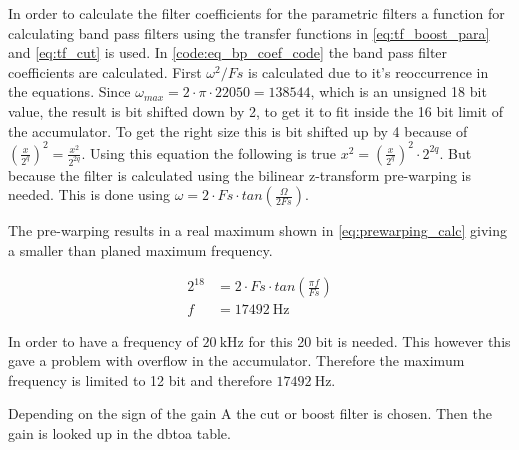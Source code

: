 In order to calculate the filter coefficients for the parametric filters a function for calculating band pass filters using the transfer functions in \autoref{eq:tf_boost_para} and \autoref{eq:tf_cut} is used. 
In \autoref{code:eq_bp_coef_code} the band pass filter coefficients are calculated. First $\omega^2/Fs$ is calculated due to it's reoccurrence in the equations. Since $\omega_{max} = 2\cdot \pi \cdot 22050 = 138544$, which is an unsigned 18 bit value, the result is bit shifted down by 2, to get it to fit inside the 16 bit limit of the accumulator. To get the right size this is bit shifted up by 4 because of $(\frac{x}{2^{q}})^2=\frac{x^2}{2^{2 q}}$. Using this equation the following is true $x^2=(\frac{x}{2^q})^2 \cdot 2^{2q}$. But because the filter is calculated using the bilinear z-transform pre-warping is needed. This is done using $\omega = 2\cdot Fs \cdot tan(\frac{\Omega}{2Fs})$.

The pre-warping results in a real maximum shown in \autoref{eq:prewarping_calc} giving a smaller than planed maximum frequency.

\begin{equation}\label{eq:prewarping_calc}
\begin{split}
	2^{18}&= 2\cdot Fs \cdot tan(\frac{\pi f}{Fs})\\
	f &= \SI{17492}{\hertz}
\end{split}
\end{equation}

In order to have a frequency of $\SI{20}{\kilo \hertz}$ for this 20 bit is needed. This however this gave a problem with overflow in the accumulator. Therefore the maximum frequency is limited to 12 bit and therefore $\SI{17492}{\hertz}$.	

Depending on the sign of the gain A the cut or boost filter is chosen. Then the gain is looked up in the dbtoa table.

